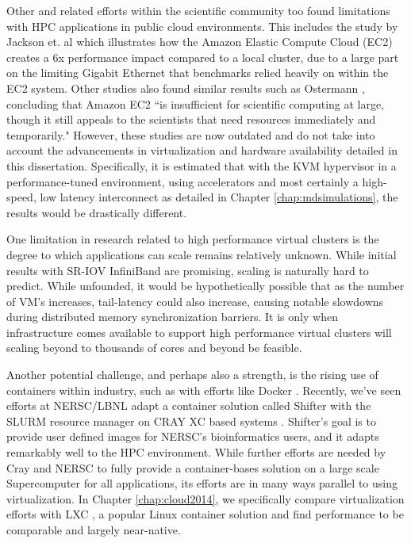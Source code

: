 Other and related efforts within the scientific community too found limitations with HPC applications in public cloud environments. This includes the study by Jackson et. al \cite{jackson2010performance} which illustrates how the Amazon Elastic Compute Cloud (EC2) creates a 6x performance impact compared to a local cluster, due to a large part on the limiting Gigabit Ethernet that benchmarks relied heavily on within the EC2 system. Other studies also found similar results such as Ostermann \cite{ostermann2009performance}, concluding that Amazon EC2 ``is insufficient for scientific computing at large, though it still appeals to the scientists that need resources immediately and temporarily."  However, these studies are now outdated and do not take into account the advancements in virtualization and hardware availability detailed in this dissertation. Specifically, it is estimated that with the KVM hypervisor in a performance-tuned environment, using accelerators and most certainly a high-speed, low latency interconnect as detailed in Chapter \ref{chap:mdsimulations}, the results would be drastically different. 


One limitation in research related to high performance virtual clusters is the degree to which applications can scale remains relatively unknown. While initial results with SR-IOV InfiniBand are promising, scaling is naturally hard to predict. While unfounded, it would be hypothetically possible that as the number of VM's increases, tail-latency could also increase, causing notable slowdowns during distributed memory synchronization barriers. It is only when infrastructure comes available to support high performance virtual clusters will scaling beyond to thousands of cores and beyond be feasible.  

Another potential challenge, and perhaps also a strength, is the rising use of containers within industry, such as with efforts like Docker \cite{merkel2014docker}. Recently, we've seen efforts at NERSC/LBNL adapt a container solution called Shifter with the SLURM resource manager on CRAY XC based systems \cite{jacobsen2015contain}. Shifter's goal is to provide user defined images for NERSC's bioinformatics users, and it adapts remarkably well to the HPC environment. While further efforts are needed by Cray and NERSC to fully provide a container-bases solution on a large scale Supercomputer for all applications, its efforts are in many ways parallel to using virtualization. In Chapter \ref{chap:cloud2014}, we specifically compare virtualization efforts with LXC \cite{xavier2013performance}, a popular Linux container solution and find performance to be comparable and largely near-native. 

